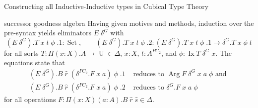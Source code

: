 \documentclass[runningheads]{llncs}
\DeclareMathOperator{\USet}{Set}
\DeclareMathOperator{\UU}{U}
\DeclareMathOperator{\Arg}{Arg}
\DeclareMathOperator{\Ix}{Ix}
\begin{document}
{\begin{section}{Constructing all Inductive-Inductive types in Cubical Type Theory}
\begin{subsection}{successor goodness algebra}
Having given motives and methods, induction over the pre-syntax yields eliminators $E\;\delta^G$ with \[(E\;\delta^G).T\;x\;t\;\phi\;.1 : \USet,\qquad (E\;\delta^G).T\;x\;t\;\phi\;.2 : (E\;\delta^G).T\;x\;t\;\phi\;.1 \to \delta^G.T\;x\;\phi\;t\] for all sorts $T : \Pi(x : X).A \to \UU \in \Delta$, $x : X$, $t : A^{PC_2}$, and $\phi : \Ix T\;\delta^G\;x$. The equations state that \begin{align*}(E\;\delta^G).B\;\hat{r}\;(\delta^{PC_2}.F\;x\;a)\;\phi\;.1&\text{ reduces to }\Arg F\;\delta^G\;x\;a\;\phi\text{ and }\\(E\;\delta^G).B\;\hat{r}\;(\delta^{PC_2}.F\;x\;a)\;\phi\;.2&\text{ reduces to }\delta^G.F\;x\;a\;\phi\end{align*} for all operations $F : \Pi(x : X)(a : A).B\;\hat{r}\;\hat{s}\in \Delta$.


\end{subsection}
\end{section}}
\end{document}
